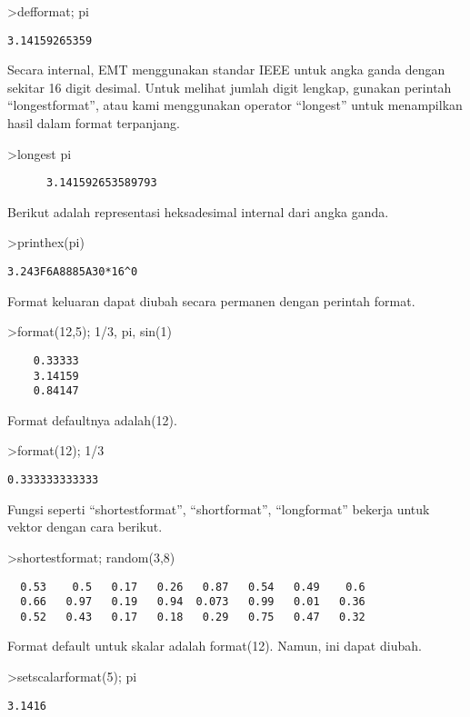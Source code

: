 \documentclass[
]{book}
\begin{document}
\textgreater defformat; pi

\begin{verbatim}
3.14159265359
\end{verbatim}

Secara internal, EMT menggunakan standar IEEE untuk angka ganda dengan sekitar 16 digit desimal. Untuk melihat jumlah digit lengkap, gunakan perintah ``longestformat'', atau kami menggunakan operator ``longest'' untuk menampilkan hasil dalam format terpanjang.

\textgreater longest pi

\begin{verbatim}
      3.141592653589793 
\end{verbatim}

Berikut adalah representasi heksadesimal internal dari angka ganda.

\textgreater printhex(pi)

\begin{verbatim}
3.243F6A8885A30*16^0
\end{verbatim}

Format keluaran dapat diubah secara permanen dengan perintah format.

\textgreater format(12,5); 1/3, pi, sin(1)

\begin{verbatim}
    0.33333 
    3.14159 
    0.84147 
\end{verbatim}

Format defaultnya adalah(12).

\textgreater format(12); 1/3

\begin{verbatim}
0.333333333333
\end{verbatim}

Fungsi seperti ``shortestformat'', ``shortformat'', ``longformat'' bekerja untuk vektor dengan cara berikut.

\textgreater shortestformat; random(3,8)

\begin{verbatim}
  0.53    0.5   0.17   0.26   0.87   0.54   0.49    0.6 
  0.66   0.97   0.19   0.94  0.073   0.99   0.01   0.36 
  0.52   0.43   0.17   0.18   0.29   0.75   0.47   0.32 
\end{verbatim}

Format default untuk skalar adalah format(12). Namun, ini dapat diubah.

\textgreater setscalarformat(5); pi

\begin{verbatim}
3.1416
\end{verbatim}
\end{document}
